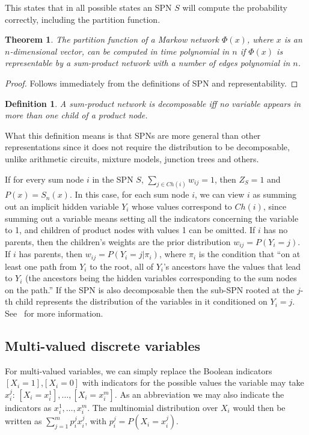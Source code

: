 \documentclass[a4paper,10pt]{article}
\theoremstyle{plain}
\newtheorem*{spn-def}{Definition}
\newtheorem*{spn-thm}{Theorem}
\begin{document}
This states that in all possible states an SPN $S$ will compute the probability correctly,
including the partition function.

\begin{spn-thm}
  The partition function of a Markow network $\Phi(x)$, where $x$ is an $n$-dimensional vector, can
  be computed in time polynomial in $n$ if $\Phi(x)$ is representable by a sum-product network with
  a number of edges polynomial in $n$.
\end{spn-thm}

\begin{proof}
  Follows immediately from the definitions of SPN and representability.
\end{proof}

\begin{spn-def}
  A sum-product network is decomposable iff no variable appears in more than one child of a product
  node.
\end{spn-def}

What this definition means is that SPNs are more general than other representations since it does
not require the distribution to be decomposable, unlike arithmetic circuits, mixture models,
junction trees and others.

If for every sum node $i$ in the SPN $S$, $\sum_{j\in Ch(i)}w_{ij}=1$, then $Z_S=1$ and $P(x)=
S_n(x)$. In this case, for each sum node $i$, we can view $i$ as summing out an implicit hidden
variable $Y_i$ whose values correspond to $Ch(i)$, since summing out a variable means setting all
the indicators concerning the variable to 1, and children of product nodes with values 1 can be
omitted. If $i$ has no parents, then the children's weights are the prior distribution $w_{ij}=
P(Y_i=j)$. If $i$ has parents, then $w_{ij}=P(Y_i=j|\pi_i)$, where $\pi_i$ is the condition that
``on at least one path from $Y_i$ to the root, all of $Y_i$'s ancestors have the values that lead
to $Y_i$ (the ancestors being the hidden variables corresponding to the sum nodes on the path.''
\cite{poon-domingos} If the SPN is also decomposable then the sub-SPN rooted at the $j$-th child
represents the distribution of the variables in it conditioned on $Y_i=j$. See~\cite{poon-domingos}
for more information.


\subsection{Multi-valued discrete variables}

For multi-valued variables, we can simply replace the Boolean indicators $[X_i=1]$,$[X_i=0]$ with
indicators for the possible values the variable may take $x_i^j$: $[X_i=x_i^1],\ldots,[X_i=x_i^m]$.
As an abbreviation we may also indicate the indicators as $x_i^1,\ldots,x_i^m$. The multinomial
distribution over $X_i$ would then be written as $\sum_{j=1}^m p_i^j x_i^j$, with $p_i^j=
P(X_i=x_i^j)$.
\end{document}
